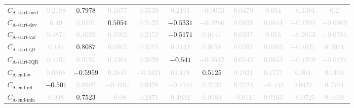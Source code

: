 \documentclass{standalone}
\newcommand{\startmedianname}{\text{A-start-med}}
\newcommand{\startmedian}{C_{\startmedianname}}
\newcommand{\startdevname}{\text{A-start-dev}}
\newcommand{\startdev}{C_{\startdevname}}
\newcommand{\startvarname}{\text{A-start-var}}
\newcommand{\startvar}{C_{\startvarname}}
\newcommand{\startqonename}{\text{A-start-Q1}}
\newcommand{\startqone}{C_{\startqonename}}
\newcommand{\startiqrname}{\text{A-start-IQR}}
\newcommand{\startiqr}{C_{\startiqrname}}
\newcommand{\lastactivitiesname}{\text{A-end-\#}}
\newcommand{\lastactivities}{C_{\lastactivitiesname}}
\newcommand{\lastactivitiesrelname}{\text{A-end-rel}}
\newcommand{\lastactivitiesrel}{C_{\lastactivitiesrelname}}
\newcommand{\lastminname}{\text{A-end-min}}
\newcommand{\lastmin}{C_{\lastminname}}
\begin{document}
\begin{tabular}{lcccccccccc}
$\startmedian$ & \textcolor{lightgray}{$0.2188$} & $0.7978$ & \textcolor{lightgray}{$0.1677$} & \textcolor{lightgray}{$0.3539$} & \textcolor{lightgray}{$0.2191$} & \textcolor{lightgray}{$-0.0053$} & \textcolor{lightgray}{$0.0479$} & \textcolor{lightgray}{$0.054$} & \textcolor{lightgray}{$-0.1381$} & \textcolor{lightgray}{$0.2$} \\ 
$\startdev$ & \textcolor{lightgray}{$0.49$} & \textcolor{lightgray}{$0.0507$} & $0.5054$ & \textcolor{lightgray}{$0.2122$} & $-0.5331$ & \textcolor{lightgray}{$-0.0286$} & \textcolor{lightgray}{$0.0838$} & \textcolor{lightgray}{$0.0614$} & \textcolor{lightgray}{$-0.1204$} & \textcolor{lightgray}{$-0.0809$} \\ 
$\startvar$ & \textcolor{lightgray}{$0.4871$} & \textcolor{lightgray}{$0.1029$} & \textcolor{lightgray}{$0.3502$} & \textcolor{lightgray}{$0.2372$} & $-0.5171$ & \textcolor{lightgray}{$0.0141$} & \textcolor{lightgray}{$0.0337$} & \textcolor{lightgray}{$0.055$} & \textcolor{lightgray}{$-0.2053$} & \textcolor{lightgray}{$-0.0781$} \\ 
$\startqone$ & \textcolor{lightgray}{$0.144$} & $0.8087$ & \textcolor{lightgray}{$0.0962$} & \textcolor{lightgray}{$0.3275$} & \textcolor{lightgray}{$0.3142$} & \textcolor{lightgray}{$0.0078$} & \textcolor{lightgray}{$0.0397$} & \textcolor{lightgray}{$0.0503$} & \textcolor{lightgray}{$-0.1021$} & \textcolor{lightgray}{$0.2071$} \\ 
$\startiqr$ & \textcolor{lightgray}{$0.4707$} & \textcolor{lightgray}{$0.0787$} & \textcolor{lightgray}{$0.4384$} & \textcolor{lightgray}{$0.2629$} & $-0.541$ & \textcolor{lightgray}{$-0.0542$} & \textcolor{lightgray}{$0.0542$} & \textcolor{lightgray}{$0.0653$} & \textcolor{lightgray}{$-0.1279$} & \textcolor{lightgray}{$-0.0421$} \\ 
$\lastactivities$ & \textcolor{lightgray}{$0.0868$} & $-0.5959$ & \textcolor{lightgray}{$0.2647$} & \textcolor{lightgray}{$-0.0321$} & \textcolor{lightgray}{$0.0178$} & $0.5125$ & \textcolor{lightgray}{$0.1021$} & \textcolor{lightgray}{$0.1777$} & \textcolor{lightgray}{$0.064$} & \textcolor{lightgray}{$0.0194$} \\ 
$\lastactivitiesrel$ & $-0.501$ & \textcolor{lightgray}{$0.0902$} & \textcolor{lightgray}{$-0.4761$} & \textcolor{lightgray}{$0.0428$} & \textcolor{lightgray}{$-0.4345$} & \textcolor{lightgray}{$0.2732$} & \textcolor{lightgray}{$0.2723$} & \textcolor{lightgray}{$-0.158$} & \textcolor{lightgray}{$0.0427$} & \textcolor{lightgray}{$0.2761$} \\ 
$\lastmin$ & \textcolor{lightgray}{$0.038$} & $0.7523$ & \textcolor{lightgray}{$-0.08$} & \textcolor{lightgray}{$0.2471$} & \textcolor{lightgray}{$0.4832$} & \textcolor{lightgray}{$0.0983$} & \textcolor{lightgray}{$-0.0111$} & \textcolor{lightgray}{$0.0163$} & \textcolor{lightgray}{$-0.0725$} & \textcolor{lightgray}{$0.0438$} \\ 

\end{tabular}
\end{document}
